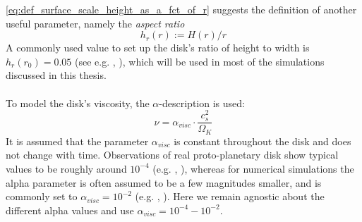     \newpage \noindent
    \autoref{eq:def_surface_scale_height_as_a_fct_of_r} suggests the definition 
    of another useful parameter, namely the \textit{aspect ratio} 
    \begin{equation}
      h_r(r):=H(r)/r
    \end{equation}
    A commonly used value to set up the disk's ratio of height to width is 
    $h_r(r_0)=0.05$
    (see e.g. \citeauthor{Kley_1999}, \citeyear{Kley_1999}), 
    which will be used in most of the simulations discussed in this thesis.
    \\
    \\
    To model the disk's viscosity, the $\alpha$-description is used:
    \begin{equation}
      \nu=\alpha_{visc}\cdot\frac{c_s^2}{\Omega_K}
    \end{equation}
    It is assumed that the parameter $\alpha_{visc}$ is constant throughout 
    the disk and does not change with time. Observations of real 
    proto-planetary disk show typical values to be roughly around 
    $10^{-4}$ (e.g. \citeauthor{Dullemond_2018}, \citeyear{Dullemond_2018}), 
    whereas for numerical simulations the alpha parameter is 
    often assumed to be a few magnitudes smaller, and is commonly set to
    $\alpha_{visc}=10^{-2}$ (e.g. \citeauthor{Bailli_2016}, 
    \citeyear{Bailli_2016}). Here we remain agnostic about the different alpha 
    values and use $\alpha_{visc}=10^{-4}-10^{-2}$.
